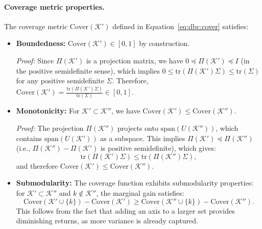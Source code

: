 \paragraph{Coverage metric properties.}
The coverage metric $\mathrm{Cover}(\mathcal{K}')$ defined in Equation~\eqref{eq:dbc:cover} satisfies:
\begin{itemize}
    \item \textbf{Boundedness:} $\mathrm{Cover}(\mathcal{K}') \in [0, 1]$ by construction.
    
    \emph{Proof:} Since $\Pi(\mathcal{K}')$ is a projection matrix, we have $0 \preceq \Pi(\mathcal{K}') \preceq I$ (in the positive semidefinite sense), which implies $0 \leq \mathrm{tr}(\Pi(\mathcal{K}') \Sigma) \leq \mathrm{tr}(\Sigma)$ for any positive semidefinite $\Sigma$.
    Therefore, $\mathrm{Cover}(\mathcal{K}') = \frac{\mathrm{tr}(\Pi(\mathcal{K}') \Sigma)}{\mathrm{tr}(\Sigma)} \in [0, 1]$.
    
    \item \textbf{Monotonicity:} For $\mathcal{K}' \subset \mathcal{K}''$, we have $\mathrm{Cover}(\mathcal{K}') \leq \mathrm{Cover}(\mathcal{K}'')$.
    
    \emph{Proof:} The projection $\Pi(\mathcal{K}'')$ projects onto $\mathrm{span}(U(\mathcal{K}''))$, which contains $\mathrm{span}(U(\mathcal{K}'))$ as a subspace.
    This implies $\Pi(\mathcal{K}') \preceq \Pi(\mathcal{K}'')$ (i.e., $\Pi(\mathcal{K}'') - \Pi(\mathcal{K}')$ is positive semidefinite), which gives:
\begin{equation}
    \mathrm{tr}(\Pi(\mathcal{K}') \Sigma) \leq \mathrm{tr}(\Pi(\mathcal{K}'') \Sigma),
\end{equation}
    and therefore $\mathrm{Cover}(\mathcal{K}') \leq \mathrm{Cover}(\mathcal{K}'')$.
    
    \item \textbf{Submodularity:} The coverage function exhibits submodularity properties: for $\mathcal{K}' \subset \mathcal{K}''$ and $k \notin \mathcal{K}''$, the marginal gain satisfies:
    \begin{equation}
    \mathrm{Cover}(\mathcal{K}' \cup \{k\}) - \mathrm{Cover}(\mathcal{K}') \geq \mathrm{Cover}(\mathcal{K}'' \cup \{k\}) - \mathrm{Cover}(\mathcal{K}'').
    \end{equation}
    This follows from the fact that adding an axis to a larger set provides diminishing returns, as more variance is already captured.
\end{itemize}

